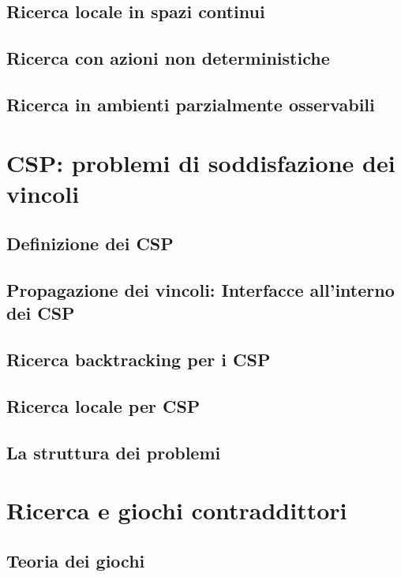 \documentclass[a4paper]{extarticle}
\begin{document}
\subsection{Ricerca locale in spazi continui}

\subsection{Ricerca con azioni non deterministiche}

\subsection{Ricerca in ambienti parzialmente osservabili}

\newpage

\section{CSP: problemi di soddisfazione dei vincoli}

\subsection{Definizione dei CSP}

\subsection{Propagazione dei vincoli: Interfacce all'interno dei CSP}

\subsection{Ricerca backtracking per i CSP}

\subsection{Ricerca locale per CSP}

\subsection{La struttura dei problemi}

\newpage

\section{Ricerca e giochi contraddittori}

\subsection{Teoria dei giochi}
\end{document}
